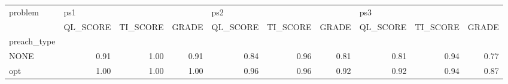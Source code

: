 \begin{tabular}{lrrrrrrrrr}
\toprule
problem & \multicolumn{3}{l}{ps1} & \multicolumn{3}{l}{ps2} & \multicolumn{3}{l}{ps3} \\
{} & QL\_SCORE & TI\_SCORE & GRADE & QL\_SCORE & TI\_SCORE & GRADE & QL\_SCORE & TI\_SCORE & GRADE \\
preach\_type &          &          &       &          &          &       &          &          &       \\
\midrule
NONE        &     0.91 &     1.00 &  0.91 &     0.84 &     0.96 &  0.81 &     0.81 &     0.94 &  0.77 \\
opt         &     1.00 &     1.00 &  1.00 &     0.96 &     0.96 &  0.92 &     0.92 &     0.94 &  0.87 \\
\bottomrule
\end{tabular}
